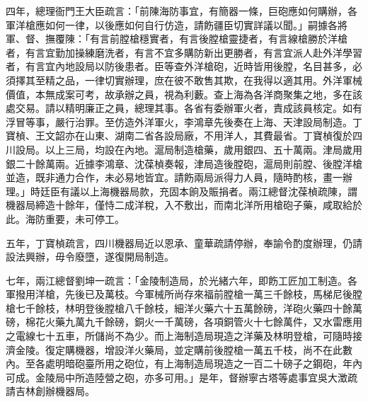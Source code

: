 \begin{pinyinscope}
四年，總理衙門王大臣疏言：「前陳海防事宜，有簡器一條，巨砲應如何購辦，各軍洋槍應如何一律，以後應如何自行仿造，請飭疆臣切實詳議以聞。」嗣據各將軍、督、撫覆陳：「有言前膛槍穩實者，有言後膛槍靈捷者，有言線槍勝於洋槍者，有言宜勤加操練磨洗者，有言不宜多購防新出更勝者，有言宜派人赴外洋學習者，有言宜內地設局以防後患者。臣等查外洋槍砲，近時皆用後膛，名目甚多，必須擇其至精之品，一律切實辦理，庶在彼不敢售其欺，在我得以適其用。外洋軍械價值，本無成案可考，故承辦之員，視為利藪。查上海為各洋商聚集之地，多在該處交易。請以精明廉正之員，總理其事。各省有委辦軍火者，責成該員核定。如有浮冒等事，嚴行治罪。至仿造外洋軍火，李鴻章先後奏在上海、天津設局制造。丁寶楨、王文韶亦在山東、湖南二省各設局廠，不用洋人，其費最省。丁寶楨復於四川設局。以上三局，均設在內地。滬局制造槍藥，歲用銀四、五十萬兩。津局歲用銀二十餘萬兩。近據李鴻章、沈葆楨奏報，津局造後膛砲，滬局則前膛、後膛洋槍並造，既非通力合作，未必易地皆宜。請飭兩局派得力人員，隨時酌核，畫一辦理。」時廷臣有議以上海機器局款，充固本餉及賑捐者。兩江總督沈葆楨疏陳，謂機器局締造十餘年，僅恃二成洋稅，入不敷出，而南北洋所用槍砲子藥，咸取給於此。海防重要，未可停工。

五年，丁寶楨疏言，四川機器局近以恩承、童華疏請停辦，奉諭令酌度辦理，仍請設法興辦，毋令廢墮，遂復開局制造。

七年，兩江總督劉坤一疏言：「金陵制造局，於光緒六年，即飭工匠加工制造。各軍撥用洋槍，先後已及萬枝。今軍械所尚存來福前膛槍一萬三千餘枝，馬梯尼後膛槍七千餘枝，林明登後膛槍八千餘枝，細洋火藥六十五萬餘磅，洋砲火藥四十餘萬磅，棉花火藥九萬九千餘磅，銅火一千萬磅，各項銅管火十七餘萬件，又水雷應用之電線七十五車，所儲尚不為少。而上海制造局現造之洋藥及林明登槍，可隨時接濟金陵。復定購機器，增設洋火藥局，並定購前後膛槍一萬五千枝，尚不在此數內。至各處明暗砲臺所用之砲位，有上海制造局現造之一百二十磅子之鋼砲，年內可成。金陵局中所造陸營之砲，亦多可用。」是年，督辦寧古塔等處事宜吳大澂疏請吉林創辦機器局。


\end{pinyinscope}
